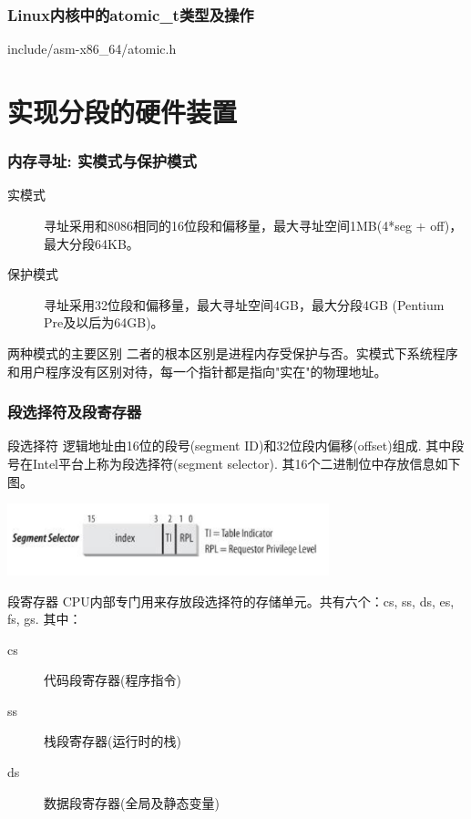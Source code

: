 \documentclass[xcolor=svgnames]{beamer}
\begin{document}
\begin{CJK*}{UTF8}{gbsn}
{}
\begin{frame}[fragile]%
\frametitle{Linux内核中的atomic\_t类型及操作}
\begin{block}{include/asm-x86\_64/atomic.h }
\lstatomict
\end{block}
\end{frame}

\section{实现分段的硬件装置}


\begin{frame}[fragile]
\frametitle{内存寻址: 实模式与保护模式}
\begin{description}
\item[实模式] 寻址采用和8086相同的16位段和偏移量，最大寻址空间1MB(4*seg + off)，最大分段64KB。
\item[保护模式] 寻址采用32位段和偏移量，最大寻址空间4GB，最大分段4GB (Pentium Pre及以后为64GB)。
\end{description}
\begin{block}{两种模式的主要区别}
二者的根本区别是进程内存受保护与否。实模式下系统程序和用户程序没有区别对待，每一个指针都是指向"实在"的物理地址。
\end{block}
\end{frame}

\begin{frame}[fragile]
\frametitle{段选择符及段寄存器}
\begin{block}{段选择符}
逻辑地址由16位的段号(segment ID)和32位段内偏移(offset)组成.
其中段号在Intel平台上称为段选择符(segment selector).
其16个二进制位中存放信息如下图。

\includegraphics[width=0.7\textwidth]{selector.png}
\end{block}
\begin{block}{段寄存器}
CPU内部专门用来存放段选择符的存储单元。共有六个：cs, ss, ds, es, fs, gs. 其中： 
\begin{description}
\item[cs] 代码段寄存器(程序指令)
\item[ss] 栈段寄存器(运行时的栈)
\item[ds] 数据段寄存器(全局及静态变量)
\end{description}
\end{block}
\end{frame}



\end{CJK*}
\end{document}
